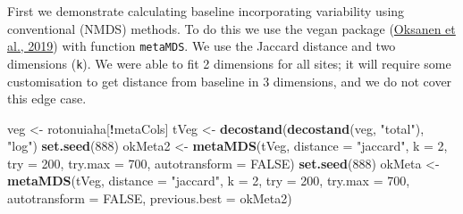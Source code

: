 \documentclass[nofonts,]{tufte-handout}
\newenvironment{Shaded}{\begin{snugshade}}{\end{snugshade}}
\newcommand{\AttributeTok}[1]{\textcolor[rgb]{0.13,0.29,0.53}{#1}}
\newcommand{\ConstantTok}[1]{\textcolor[rgb]{0.56,0.35,0.01}{#1}}
\newcommand{\DecValTok}[1]{\textcolor[rgb]{0.00,0.00,0.81}{#1}}
\newcommand{\FunctionTok}[1]{\textcolor[rgb]{0.13,0.29,0.53}{\textbf{#1}}}
\newcommand{\NormalTok}[1]{#1}
\newcommand{\OtherTok}[1]{\textcolor[rgb]{0.56,0.35,0.01}{#1}}
\newcommand{\SpecialCharTok}[1]{\textcolor[rgb]{0.81,0.36,0.00}{\textbf{#1}}}
\newcommand{\StringTok}[1]{\textcolor[rgb]{0.31,0.60,0.02}{#1}}
\begin{document}
First we demonstrate calculating baseline incorporating variability
using conventional (NMDS) methods. To do this we use the vegan package
(\protect\hyperlink{ref-oksanen_2019_vegan}{Oksanen et al., 2019}) with
function \texttt{metaMDS}. We use the Jaccard distance and two
dimensions (\texttt{k}). We were able to fit 2 dimensions for all sites;
it will require some customisation to get distance from baseline in 3
dimensions, and we do not cover this edge case.

\begin{Shaded}
\begin{Highlighting}[]
\NormalTok{veg }\OtherTok{\textless{}{-}}\NormalTok{ rotonuiaha[}\SpecialCharTok{!}\NormalTok{metaCols]}
\NormalTok{tVeg }\OtherTok{\textless{}{-}} \FunctionTok{decostand}\NormalTok{(}\FunctionTok{decostand}\NormalTok{(veg, }\StringTok{"total"}\NormalTok{), }\StringTok{"log"}\NormalTok{)}
\FunctionTok{set.seed}\NormalTok{(}\DecValTok{888}\NormalTok{)}
\NormalTok{okMeta2 }\OtherTok{\textless{}{-}} \FunctionTok{metaMDS}\NormalTok{(tVeg, }
                  \AttributeTok{distance =} \StringTok{"jaccard"}\NormalTok{, }\AttributeTok{k =} \DecValTok{2}\NormalTok{, }\AttributeTok{try =} \DecValTok{200}\NormalTok{,}
                  \AttributeTok{try.max =} \DecValTok{700}\NormalTok{,}
                  \AttributeTok{autotransform =} \ConstantTok{FALSE}\NormalTok{)}
\FunctionTok{set.seed}\NormalTok{(}\DecValTok{888}\NormalTok{)}
\NormalTok{okMeta }\OtherTok{\textless{}{-}} \FunctionTok{metaMDS}\NormalTok{(tVeg, }
                  \AttributeTok{distance =} \StringTok{"jaccard"}\NormalTok{, }\AttributeTok{k =} \DecValTok{2}\NormalTok{, }\AttributeTok{try =} \DecValTok{200}\NormalTok{,}
                  \AttributeTok{try.max =} \DecValTok{700}\NormalTok{,}
                  \AttributeTok{autotransform =} \ConstantTok{FALSE}\NormalTok{,}
                  \AttributeTok{previous.best =}\NormalTok{ okMeta2)}
\end{Highlighting}
\end{Shaded}
\end{document}
